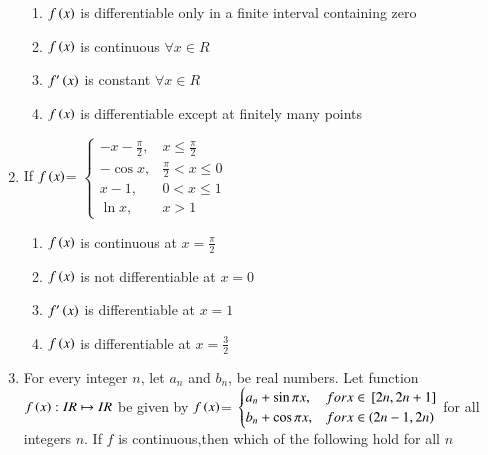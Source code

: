\documentclass[journal,12pt,twocolumn]{IEEEtran}
\theoremstyle{remark}
\begin{document}
\begin{enumerate}
    \hfill 
    {}
    
    \begin{enumerate}[label=(\alph*)]
        
        \item $f\left(x\right)$ is differentiable only in a finite interval containing zero 
        \item $f\left(x\right)$ is continuous $\forall x\in R$
        \item $f'\left(x\right)$ is constant $\forall x\in R$
        \item $f\left(x\right)$ is differentiable except at finitely many points 
    \end{enumerate}


    \item 
    If $f\left(x\right)$= 
    $\begin{cases}
        -x-\frac{\pi}{2}, & x\leq \frac{\pi}{2} \\
        -\cos x, & \frac{\pi}{2}<x\leq 0 \\
        x-1, & 0<x\leq1 \\
        \ln x, & x>1
    \end{cases}$ 

    \hfill 
    {}
    
    \begin{enumerate}[label=(\alph*)]
        
        \item $f\left(x\right)$ is continuous at $x=\frac{\pi}{2}$
        \item $f\left(x\right)$ is not differentiable at $x=0$
        \item $f'\left(x\right)$ is differentiable at $x=1$
        \item $f\left(x\right)$ is differentiable at $x=\frac{3}{2}$
    \end{enumerate}


    \item 
    For every integer $n$, let $a_n$ and $b_n$, be real numbers. Let function $f\left(x\right): IR \mapsto IR$ be given by
    $f\left(x\right)$= 
    $\begin{cases}
       a_n+\sin\pi x, & for x\in {}\left[2n,2n+1\right] \\
       b_n+\cos\pi x, & for x\in \left(2n-1,2n\right)
    \end{cases}$
    for all integers $n$. If $f$ is continuous,then which of the following hold for all $n$ 

    \hfill 
    {}
    

\end{enumerate}
\end{document}
